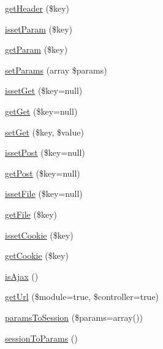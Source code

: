 \begin{DoxyCompactItemize}
\item 
\hyperlink{class_anemo_1_1_application_1_1_http_1_1_request_aa1f2a2f92a2561c725c77e9aef934553}{getHeader} (\$key)
\item 
\hyperlink{class_anemo_1_1_application_1_1_http_1_1_request_af1a95a5664428a781019e5ef56006507}{issetParam} (\$key)
\item 
\hyperlink{class_anemo_1_1_application_1_1_http_1_1_request_ac30e143829b81d81c9fa0f6d6c8542fe}{getParam} (\$key)
\item 
\hyperlink{class_anemo_1_1_application_1_1_http_1_1_request_a490ec24c6b656e391669feb5ddcd6620}{setParams} (array \$params)
\item 
\hyperlink{class_anemo_1_1_application_1_1_http_1_1_request_a4b9574bc2b8f462ec1f216b8cdcbe2cf}{issetGet} (\$key=null)
\item 
\hyperlink{class_anemo_1_1_application_1_1_http_1_1_request_aee3cdce4b34819cc145af3aa09cbb02d}{getGet} (\$key=null)
\item 
\hyperlink{class_anemo_1_1_application_1_1_http_1_1_request_a6d711e62d8ca2300d631636fa6177b76}{setGet} (\$key, \$value)
\item 
\hyperlink{class_anemo_1_1_application_1_1_http_1_1_request_a46092d77787f6220fa8ed94c41780f20}{issetPost} (\$key=null)
\item 
\hyperlink{class_anemo_1_1_application_1_1_http_1_1_request_abfecde60c98a1f805b56387933b6f6c2}{getPost} (\$key=null)
\item 
\hyperlink{class_anemo_1_1_application_1_1_http_1_1_request_aed44502c1b16fa2e422a1380d2f53a2e}{issetFile} (\$key=null)
\item 
\hyperlink{class_anemo_1_1_application_1_1_http_1_1_request_a6c6e689f88ad22aa3de05f417e26bc6f}{getFile} (\$key)
\item 
\hyperlink{class_anemo_1_1_application_1_1_http_1_1_request_a1e1772d143ce952d1ad3931942b676ba}{issetCookie} (\$key)
\item 
\hyperlink{class_anemo_1_1_application_1_1_http_1_1_request_a5397dad675daf81256839b7fb70b8234}{getCookie} (\$key)
\item 
\hyperlink{class_anemo_1_1_application_1_1_http_1_1_request_aac147108d427123081cc91d8d9f32c8f}{isAjax} ()
\item 
\hyperlink{class_anemo_1_1_application_1_1_http_1_1_request_a2de726ac3f927213a7d52a1fc7fc2aed}{getUrl} (\$module=true, \$controller=true)
\item 
\hyperlink{class_anemo_1_1_application_1_1_http_1_1_request_a993e1c792c521b7dff3013c79c2d8b60}{paramsToSession} (\$params=array())
\item 
\hyperlink{class_anemo_1_1_application_1_1_http_1_1_request_ab8910e042466f2d8c34c6da8c993f90e}{sessionToParams} ()
\end{DoxyCompactItemize}
